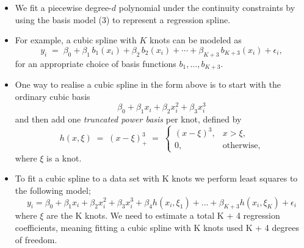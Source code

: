 \documentclass{article}
\begin{document}
\begin{itemize}
  \item We fit a piecewise degree-$d$ polynomial under the continuity constraints by using the basis model (3) to represent a regression spline.
  \item For example, a cubic spline with $K$ knots can be modeled as
    \begin{equation*}
      y_i \;=\; \beta_0 + \beta_1\,b_1(x_i) + \beta_2\,b_2(x_i) + \cdots + \beta_{K+3}\,b_{K+3}(x_i) + \epsilon_i,
    \end{equation*}
    for an appropriate choice of basis functions $b_1,\dots,b_{K+3}$.
  \item One way to realise a cubic spline in the form above is to start with the ordinary cubic basis
    \[
      \beta_0 + \beta_1 x_i + \beta_2 x_i^2 + \beta_3 x_i^3
    \]
    and then add one \emph{truncated power basis} per knot, defined by
    \begin{equation*}
      h(x,\xi) \;=\; (x - \xi)_+^3
      \;=\;
      \begin{cases}
        (x - \xi)^3, & x > \xi,\\
        0,           & \text{otherwise},
      \end{cases}
    \end{equation*}
    where $\xi$ is a knot.
    \item To fit a cubic spline to a data set with K knots we perform least squares to the following model;
    \begin{equation*}
        y_i = \beta_0 + \beta_1 x_i + \beta_2 x_i^2 + \beta_3x_i^3 + \beta_4 h(x_i,\xi_1) + ... + \beta_{K+3} h(x_i,\xi_K) + \epsilon_i
    \end{equation*}
    where $\xi$ are the K knots. We need to estimate a total K + 4 regression coefficients, meaning fitting a cubic spline with K knots used K + 4 degrees of freedom.
\end{itemize}
\end{document}

